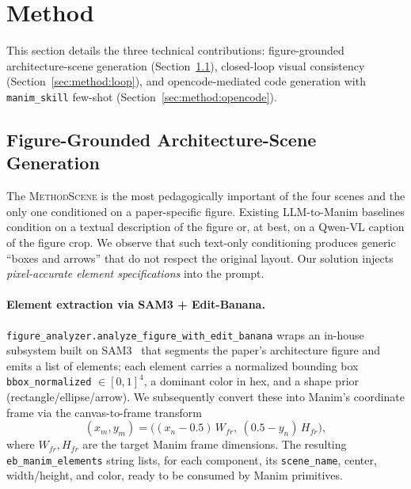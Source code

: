 \documentclass[11pt,a4paper]{article}
\begin{document}
\section{Method}
\label{sec:method}

This section details the three technical contributions: figure-grounded architecture-scene generation (Section~\ref{sec:method:figure}), closed-loop visual consistency (Section~\ref{sec:method:loop}), and opencode-mediated code generation with \texttt{manim\_skill} few-shot (Section~\ref{sec:method:opencode}).

\subsection{Figure-Grounded Architecture-Scene Generation}
\label{sec:method:figure}

The \textsc{MethodScene} is the most pedagogically important of the four scenes and the only one conditioned on a paper-specific figure. Existing LLM-to-Manim baselines condition on a textual description of the figure or, at best, on a Qwen-VL caption of the figure crop. We observe that such text-only conditioning produces generic ``boxes and arrows'' that do not respect the original layout. Our solution injects \emph{pixel-accurate element specifications} into the prompt.

\paragraph{Element extraction via SAM3 + Edit-Banana.}
\texttt{figure\_analyzer.analyze\_figure\_with\_edit\_banana} wraps an in-house subsystem built on SAM3~\citep{ravi2024sam2} that segments the paper's architecture figure and emits a list of elements; each element carries a normalized bounding box \texttt{bbox\_normalized} $\in [0,1]^4$, a dominant color in hex, and a shape prior (rectangle/ellipse/arrow). We subsequently convert these into Manim's coordinate frame via the canvas-to-frame transform
\begin{equation}
(x_m, y_m) = \bigl((x_n - 0.5)\,W_{fr},\ (0.5 - y_n)\,H_{fr}\bigr),
\end{equation}
where $W_{fr}, H_{fr}$ are the target Manim frame dimensions. The resulting \texttt{eb\_manim\_elements} string lists, for each component, its \texttt{scene\_name}, center, width/height, and color, ready to be consumed by Manim primitives.
\end{document}
